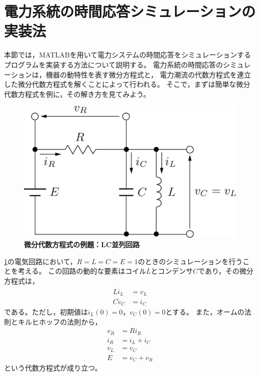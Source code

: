 \documentclass[tombow,dvipdfmx]{corona-a5-1.1}
\begin{document}
\section{電力系統の時間応答シミュレーションの実装法}

本節では，MATLABを用いて電力システムの時間応答をシミュレーションするプログラムを実装する方法について説明する。
電力系統の時間応答のシミュレーションは，機器の動特性を表す微分方程式と，
電力潮流の代数方程式を連立した微分代数方程式を解くことによって行われる。
そこで，まずは簡単な微分代数方程式を例に，その解き方を見てみよう。

\begin{例}[簡単な例題]\label{ex:dae_ex1}
\begin{figure}[t]
  \centering
  \includegraphics[width = .4\linewidth]{figs/circkawaguchi}
  \medskip
  \caption{\textbf{微分代数方程式の例題：LC並列回路}}
  \label{fig:RLC}
  \medskip
\end{figure}
\ref{fig:RLC}の電気回路において，$R=L=C=E=1$のときのシミュレーションを行うことを考える。
この回路の動的な要素はコイル$L$とコンデンサ$C$であり，その微分方程式は，
\begin{subequations}\label{eq:ex_de}
  \begin{align}
    L\dot i_L & = v_L \\
    C\dot v_C & = i_C
  \end{align}
\end{subequations}
である。ただし，初期値は$i_L(0)=0$，$v_C(0)=0$とする。
また，オームの法則とキルヒホッフの法則から，
\begin{subequations}\label{eq:ex_ae}
  \begin{align}
    v_R & =R i_R      \\
    i_R & = i_L + i_C \\
    v_L & = v_C       \\
    E   & = v_C + v_R
  \end{align}
\end{subequations}
という代数方程式が成り立つ。


\end{例}
\end{document}
